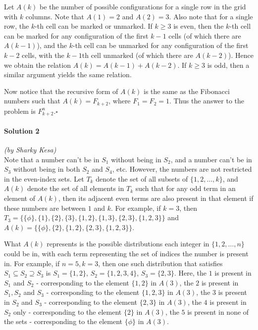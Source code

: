 \documentclass[10pt]{article}
\begin{document}
		Let \(A(k)\) be the number of possible configurations for a single row in the grid with \(k\) columns. Note that \(A(1) = 2\) and \(A(2) = 3\). Also note that for a single row, the \(k\)-th cell can be marked or unmarked. If \(k \geq 3\) is even, then the \(k\)-th cell can be marked for any configuration of the first \(k-1\) cells (of which there are \(A(k-1)\)), and the \(k\)-th cell can be unmarked for any configuration of the first \(k-2\) cells, with the \(k-1\)th cell unmarked (of which there are \(A(k-2)\)). Hence we obtain the relation \(A(k) = A(k-1) + A(k-2)\). If \(k \geq 3\) is odd, then a similar argument yields the same relation.
		
		Now notice that the recursive form of \(A(k)\) is the same as the Fibonacci numbers such that \(A(k) = F_{k+2}\), where \(F_1 = F_2 = 1\). Thus the answer to the problem is \(F_{k+2}^n\).\hfill\ensuremath{\square}\\
		
		\noindent \makebox[\linewidth]{\rule{\textwidth}{0.4pt}}
	
	\paragraph{Solution 2} \textit{(by Sharky Kesa)}\\
		
	\noindent Note that a number can't be in $S_1$ without being in $S_2$, and a number can't be in $S_3$ without being in both $S_2$ and $S_4$, etc. However, the numbers are not restricted in the even-index sets. Let $T_k$ denote the set of all subsets of $\{1, 2, \dots, k\}$, and $A(k)$ denote the set of all elements in $T_k$ such that for any odd term in an element of $A(k)$, then its adjacent even terms are also present in that element if these numbers are between $1$ and $k$. For example, if $k=3$, then $T_3 = \{\{\phi\}, \{1\}, \{2\}, \{3\}, \{1, 2\}, \{1, 3\}, \{2, 3\}, \{1, 2, 3\}\}$ and $A(k) = \{\{\phi\}, \{2\}, \{1, 2\}, \{2, 3\}, \{1, 2, 3\}\}$. 
	
	What $A(k)$ represents is the possible distributions each integer in $\{1, 2, \dots, n\}$ could be in, with each term representing the set of indices the number is present in. For example, if $n=5, k=3$, then one such distribution that satisfies $S_1 \subseteq S_2 \supseteq S_3$ is $S_1 = \{1, 2\}$, $S_2 = \{1, 2, 3, 4\}$, $S_3 = \{2, 3\}$. Here, the $1$ is present in $S_1$ and $S_2$ - corresponding to the element $\{1, 2\}$ in $A(3)$, the $2$ is present in $S_1, S_2$ and $S_3$ - corresponding to the element $\{1, 2, 3\}$ in $A(3)$, the $3$ is present in $S_2$ and $S_3$ - corresponding to the element $\{2, 3\}$ in $A(3)$, the $4$ is present in $S_2$ only - corresponding to the element $\{2\}$ in $A(3)$, the $5$ is present in none of the sets - corresponding to the element $\{\phi \}$ in $A(3)$.
	
\end{document}

